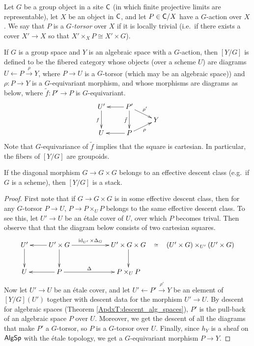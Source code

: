  \begin{definition}
   Let $G$ be a group object in a site $\text{\sf C}$ (in which finite projective limits are
   representable), let $X$ be an object in $\text{\sf C}$, and let $P\in \text{\sf C}/X$ have a $G$-action
   over $X$. We say that $P$ is a \emph{$G$-torsor} over $X$ if it is locally trivial
   (i.e.~if there exists a cover $X'\to X$ so that $X'\times_X P\cong X'\times G$).
 \end{definition}
 \begin{definition}
   If $G$ is a group space and $Y$ is an algebraic space with a $G$-action, then $[Y/G]$
   is defined to be the fibered category whose objects (over a scheme $U$) are diagrams
   $U\leftarrow P\xrightarrow{\rho} Y$, where $P\to U$ is a $G$-torsor (which may be an
   algebraic space)) and $\rho:P\to Y$ is a $G$-equivariant morphism, and whose morphisms
   are diagrams as below, where $\tilde f:P'\to P$ is $G$-equivariant.
   \[\xymatrix@R-1.5pc{
    U'\ar[dd]_f & P'\ar[l]\ar[dd]_{\tilde f}\ar[dr]^{\rho'}\\ & & Y\\
    U & P\ar[l]\ar[ur]_\rho
   }\]
    Note that $G$-equivariance of $\tilde f$ implies that the square is cartesian. In
   particular, the fibers of $[Y/G]$ are groupoids.
 \end{definition}
 \begin{proposition}\label{lec26P:[Y/G]=stack}
   If the diagonal morphism $G\to G\times G$ belongs to an effective descent class
   (e.g.~if $G$ is a scheme), then $[Y/G]$ is a stack.
 \end{proposition}
 \begin{proof}
   First note that if $G\to G\times G$ is in some effective descent class, then for any
   $G$-torsor $P\to U$, $P\to P\times_U P$ belongs to the same effective descent class.
   To see this, let $U'\to U$ be an \'etale cover of $U$, over which $P$ becomes trival.
   Then observe that that the diagram below consists of two cartesian squares.
   \[\xymatrix{
    U'\ar[d] & U'\times G\ar[d]\ar[l] \ar[rr]^<>(.5){\id_{U'}\times \Delta_G}
        & & U'\times G\times G \ar[d] \ar@{}[r]|<>(.5)\cong
        &(U'\times G)\times_{U'}(U'\times G)\\
    U & P\ar[l]\ar[rr]^<>(.5)\Delta & & P\times_U P
   }\]
    Now let $U'\to U$ be an \'etale cover, and let $U'\leftarrow P'\xrightarrow{\rho'} Y$
   be an element of $[Y/G](U')$ together with descent data for the morphism $U'\to U$. By
   descent for algebraic spaces (Theorem \ref{ApdxT:descent_alg_spaces}), $P'$ is the
   pull-back of an algebraic space $P$ over $U$. Moreover, we get the descent of all the
   diagrams that make $P'$ a $G$-torsor, so $P$ is a $G$-torsor over $U$. Finally, since
   $h_Y$ is a sheaf on $\text{\sf AlgSp}$ with the \'etale topology, we get a $G$-equivariant
   morphism $P\to Y$.
 \end{proof}
